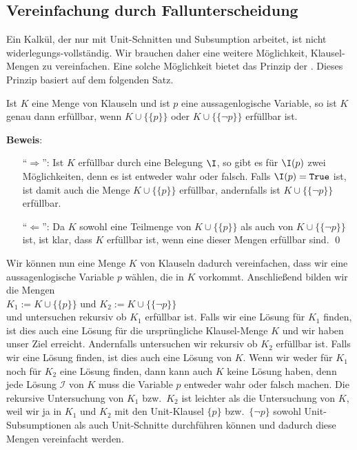 \subsection{Vereinfachung durch Fallunterscheidung}
Ein Kalkül, der nur mit Unit-Schnitten und Subsumption arbeitet, ist nicht 
widerlegungs-vollständig.  Wir brauchen 
daher eine weitere Möglichkeit, Klausel-Mengen zu vereinfachen.
Eine solche Möglichkeit bietet das Prinzip der
.  Dieses Prinzip basiert auf dem folgenden
Satz.

\begin{Satz}
  Ist $K$ eine Menge von Klauseln und ist $p$ eine aussagenlogische Variable, 
  so ist $K$ genau dann erfüllbar, wenn $K \cup \bigl\{\{p\}\bigr\}$ oder 
  $K \cup \bigl\{\{\neg p\}\bigr\}$ erfüllbar ist.  
\end{Satz}

\noindent
\textbf{Beweis}:
\begin{enumerate}
\item[``$\Rightarrow$'':] 
  Ist $K$ erfüllbar durch eine Belegung $\I$, so gibt es für  $\I(p)$ zwei Möglichkeiten, denn 
  es ist entweder wahr oder falsch.  Falls $\I(p) = \texttt{True}$ ist, ist damit auch die Menge $K \cup
  \bigl\{\{p\}\bigr\}$ erfüllbar, andernfalls ist 
  $K \cup \bigl\{\{\neg p\}\bigr\}$ erfüllbar. 
\item[``$\Leftarrow$'':] 
  Da $K$ sowohl eine Teilmenge von $K \cup \bigl\{\{p\}\bigr\}$ als auch von 
  $K \cup \bigl\{\{\neg p\}\bigr\}$ ist, ist klar, dass $K$ erfüllbar
  ist, wenn eine dieser Mengen erfüllbar sind.  
\qed
\end{enumerate}

Wir können nun eine Menge $K$ von Klauseln dadurch vereinfachen, dass wir eine
aussagenlogische Variable $p$ wählen, die in $K$ vorkommt.
Anschließend bilden wir die Mengen \\[0.2cm]
\hspace*{1.3cm} $K_1 := K \cup \bigl\{\{p\}\bigr\}$ \quad und \quad $K_2 := K \cup
\bigl\{\{\neg p\}\bigr\}$
\\[0.2cm]
und untersuchen rekursiv ob $K_1$ erfüllbar ist.  Falls wir eine Lösung für $K_1$ finden,
ist dies auch eine Lösung für die ursprüngliche Klausel-Menge $K$ und wir haben unser Ziel
erreicht.
Andernfalls untersuchen wir rekursiv ob $K_2$ erfüllbar ist.
Falls wir eine Lösung finden, ist dies auch eine Lösung von $K$.  Wenn wir weder
für $K_1$ noch für $K_2$ eine Lösung finden, dann kann auch $K$ keine Lösung haben,
denn jede Lösung $\mathcal{I}$ von $K$ muss die Variable $p$ entweder wahr oder falsch machen.
Die rekursive Untersuchung von $K_1$ bzw.~$K_2$ ist leichter als die Untersuchung von $K$,
weil wir ja in $K_1$ und $K_2$ mit den Unit-Klausel $\{p\}$ bzw.~$\{\neg p\}$
sowohl Unit-Subsumptionen als auch Unit-Schnitte durchführen können und dadurch diese Mengen vereinfacht
werden. 


